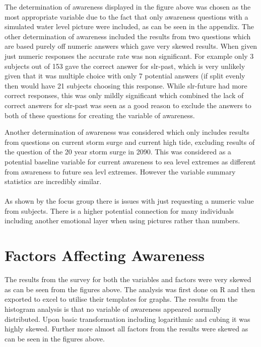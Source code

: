 The determination of awareness displayed in the figure above was chosen as the most appropriate variable due to the fact that only awareness questions with a simulated water level picture were included, as can be seen in the appendix. The other determination of awareness included the results from two questions which are based purely off numeric answers which gave very skewed results. When given just numeric responses the accurate rate was non significant. For example only 3 subjects out of 153 gave the correct answer for slr-past, which is very unlikely given that it was multiple choice with only 7 potential answers (if split evenly then would have 21 subjects choosing this response. While slr-future had more correct responses, this was only mildly significant which combined the lack of correct answers for slr-past was seen as a good reason to exclude the answers to both of these questions for creating the variable of awareness. 

Another determination of awareness was considered which only includes results from questions on current storm surge and current high tide, excluding results of the question of the 20 year storm surge in 2090. This was considered as a potential baseline variable for current awareness to sea level extremes as different from awareness to future sea levl extremes. However the variable summary statistics are incredibly similar. 




\paragraph{}
As shown by the focus group there is issues with just requesting a numeric value from subjects. There is a higher potential connection for many individuals including another emotional layer when using pictures rather than numbers. 

\section{Factors Affecting Awareness}
The results from the survey for both the variables and factors were very skewed as can be seen from the figures above. The analysis was first done on R and then exported to excel to utilise their templates for graphs. The results from the histogram analysis is that no variable of awareness appeared normally distributed. Upon basic transformation including logarithmic and cubing it was highly skewed. Further more almost all factors from the results were skewed as can be seen in the figures above.   

